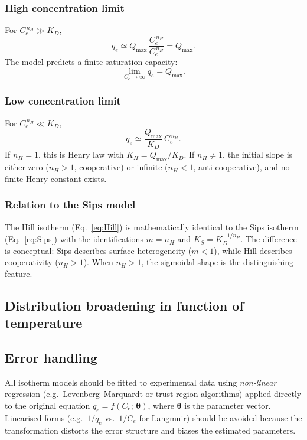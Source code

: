 \documentclass[12pt]{article}
\begin{document}
	\subsubsection{High concentration limit}

	For $C_e^{\,n_H} \gg K_D$,
	\begin{equation}
		q_e \simeq Q_{\max}\,\frac{C_e^{\,n_H}}{C_e^{\,n_H}} = Q_{\max}.
	\end{equation}
	The model predicts a finite saturation capacity:
	\begin{equation}
		\boxed{\lim_{C_e \to \infty} q_e = Q_{\max}.}
	\end{equation}

	\subsubsection{Low concentration limit}

	For $C_e^{\,n_H} \ll K_D$,
	\begin{equation}
		q_e \simeq \frac{Q_{\max}}{K_D}\, C_e^{\,n_H}.
	\end{equation}
	If $n_H = 1$, this is Henry law with $K_H = Q_{\max}/K_D$.
	If $n_H \neq 1$, the initial slope is either zero ($n_H > 1$,
	cooperative) or infinite ($n_H < 1$, anti-cooperative), and no
	finite Henry constant exists.

	\subsubsection{Relation to the Sips model}

	The Hill isotherm (Eq.~\eqref{eq:Hill}) is mathematically
	identical to the Sips isotherm (Eq.~\eqref{eq:Sips}) with the
	identifications $m = n_H$ and $K_S = K_D^{-1/n_H}$. The
	difference is conceptual: Sips describes surface heterogeneity
	($m < 1$), while Hill describes cooperativity ($n_H > 1$).
	When $n_H > 1$, the sigmoidal shape is the distinguishing
	feature.

	\subsection{Distribution broadening in function of temperature}
	
	\subsection{Error handling}

	All isotherm models should be fitted to experimental data using
	\emph{non-linear} regression (e.g.\ Levenberg--Marquardt or
	trust-region algorithms) applied directly to the original equation
	$q_e = f(C_e;\,\boldsymbol{\theta})$, where
	$\boldsymbol{\theta}$ is the parameter vector.
	Linearised forms (e.g.\ $1/q_e$ vs.\ $1/C_e$ for Langmuir) should
	be avoided because the transformation distorts the error structure
	and biases the estimated parameters.
\end{document}
